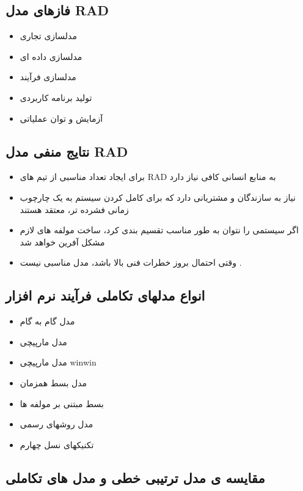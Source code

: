 \documentclass{article}
\begin{document}
\subsection{فازهای مدل RAD}

\begin{itemize}
	\item مدلسازی تجاری
	\item مدلسازی داده ای
	\item مدلسازی فرآیند
	\item تولید برنامه کاربردی
	\item آزمایش و توان عملیاتی
\end{itemize}


\subsection{نتایج منفی مدل RAD}


\begin{itemize}
	\item برای ایجاد تعداد مناسبی از تیم های RAD به منابع انسانی کافی نیاز دارد
	\item نیاز به سازندگان و مشتریانی دارد که برای کامل کردن سیستم به یک چارچوب زمانی فشرده تر، معتقد هستند
	\item اگر سیستمی را نتوان به طور مناسب تقسیم بندی کرد، ساخت مولفه های لازم مشکل آفرین خواهد شد
	\item وقتی احتمال بروز خطرات فنی بالا باشد، مدل مناسبی نیست .
\end{itemize}


\subsection{انواع مدلهای تکاملی فرآیند نرم افزار}

\begin{itemize}
	\item مدل گام به گام
	\item مدل مارپیچی
	\item مدل مارپیچی winwin
	\item مدل بسط همزمان
	\item بسط مبتنی بر مولفه ها
	\item مدل روشهای رسمی
	\item تکنیکهای نسل چهارم
\end{itemize}



\subsection{مقایسه ی مدل ترتیبی خطی و مدل های تکاملی}
\end{document}

